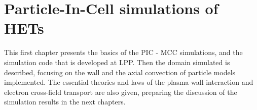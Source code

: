 
\chapter{Particle-In-Cell simulations of HETs}
\label{ch-1}

\begin{Chabstract}
  
This first chapter presents the basics of the \ac{PIC} - \ac{MCC} simulations, and the simulation code \LPPic that is developed at \ac{LPP}.
Then the domain simulated is described, focusing on the wall and the axial convection of particle models implemented.
The essential theories and laws of the plasma-wall interaction and electron cross-field transport are also given, preparing the discussion of the simulation results in the next chapters.

\end{Chabstract}

\minitoc


 












